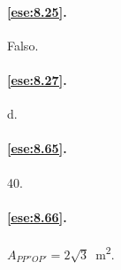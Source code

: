 \paragraph{\ref{ese:8.25}.}
Falso.

\paragraph{\ref{ese:8.27}.}
d.

\paragraph{\ref{ese:8.65}.}
40.

\paragraph{\ref{ese:8.66}.}
$A_{PP''OP'}=2\sqrt{3}$~m\textsuperscript{2}.

\endgroup
